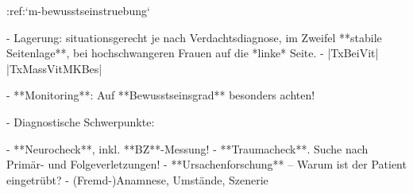 \label{proc:MR40001B}
:ref:`m-bewusstseinstruebung`
\begin{itemize}
  -   Lagerung: situationsgerecht je nach
  Verdachtsdiagnose, im Zweifel **stabile
  Seitenlage**, bei hochschwangeren Frauen auf die
  *linke* Seite.
  -   |TxBeiVit| |TxMassVitMKBes|
  
  \begin{itemize}
    -   **Monitoring**: Auf **Bewusstseinsgrad**
    besonders achten!
  \end{itemize}
  
  
  -   Diagnostische Schwerpunkte:
  \begin{itemize}
    -   **Neurocheck**, inkl. **BZ**-Messung!
    -   **Traumacheck**. Suche nach Primär- und
    Folgeverletzungen!
    -   **Ursachenforschung** -- Warum ist der
    Patient eingetrübt?
    -   (Fremd-)Anamnese, Umstände, Szenerie
  \end{itemize}
\end{itemize}
